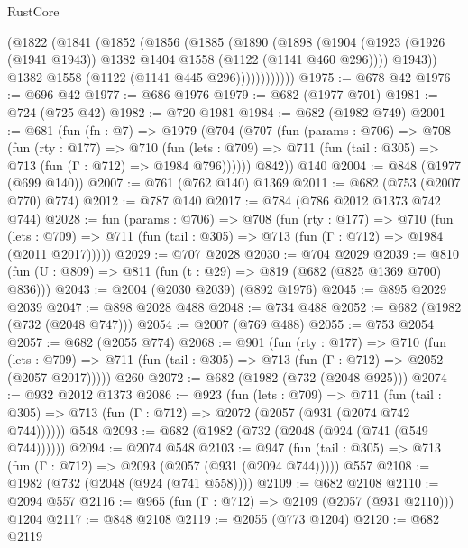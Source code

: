 \begin{lexlean}{RustCore}
\begin{coremodule}
              (@1822
                (@1841
                  (@1852
                    (@1856
                      (@1885
                        (@1890
                          (@1898
                            (@1904
                              (@1923
                                (@1926 (@1941 @1943))
                                @1382
                                @1404
                                @1558
                                (@1122 (@1141 @460 @296))))
                            @1943))
                        @1382
                        @1558
                        (@1122 (@1141 @445 @296))))))))))))
@1975 := @678 @42
@1976 := @696 @42
@1977 := @686 @1976
@1979 := @682 (@1977 @701)
@1981 := @724 (@725 @42)
@1982 := @720 @1981
@1984 := @682 (@1982 @749)
@2001 := @681
    (fun (fn : @7) =>
    @1979
      (@704
        (@707
          (fun (params : @706) =>
          @708
            (fun (rty : @177) =>
            @710
              (fun (lets : @709) =>
              @711 (fun (tail : @305) => @713 (fun (Γ : @712) => @1984 @796))))))
        @842))
    @140
@2004 := @848 (@1977 (@699 @140))
@2007 := @761 (@762 @140) @1369
@2011 := @682 (@753 (@2007 @770) @774)
@2012 := @787 @140
@2017 := @784 (@786 @2012 @1373 @742 @744)
@2028 := fun (params : @706) =>
  @708
    (fun (rty : @177) =>
    @710
      (fun (lets : @709) =>
      @711 (fun (tail : @305) => @713 (fun (Γ : @712) => @1984 (@2011 @2017)))))
@2029 := @707 @2028
@2030 := @704 @2029
@2039 := @810 (fun (U : @809) => @811 (fun (t : @29) => @819 (@682 (@825 @1369 @700) @836)))
@2043 := @2004 (@2030 @2039) (@892 @1976)
@2045 := @895 @2029 @2039
@2047 := @898 @2028 @488
@2048 := @734 @488
@2052 := @682 (@1982 (@732 (@2048 @747)))
@2054 := @2007 (@769 @488)
@2055 := @753 @2054
@2057 := @682 (@2055 @774)
@2068 := @901
    (fun (rty : @177) =>
    @710
      (fun (lets : @709) =>
      @711 (fun (tail : @305) => @713 (fun (Γ : @712) => @2052 (@2057 @2017)))))
    @260
@2072 := @682 (@1982 (@732 (@2048 @925)))
@2074 := @932 @2012 @1373
@2086 := @923
    (fun (lets : @709) =>
    @711 (fun (tail : @305) => @713 (fun (Γ : @712) => @2072 (@2057 (@931 (@2074 @742 @744))))))
    @548
@2093 := @682 (@1982 (@732 (@2048 (@924 (@741 (@549 @744))))))
@2094 := @2074 @548
@2103 := @947 (fun (tail : @305) => @713 (fun (Γ : @712) => @2093 (@2057 (@931 (@2094 @744))))) @557
@2108 := @1982 (@732 (@2048 (@924 (@741 @558))))
@2109 := @682 @2108
@2110 := @2094 @557
@2116 := @965 (fun (Γ : @712) => @2109 (@2057 (@931 @2110))) @1204
@2117 := @848 @2108
@2119 := @2055 (@773 @1204)
@2120 := @682 @2119

\end{coremodule}
\end{lexlean}
